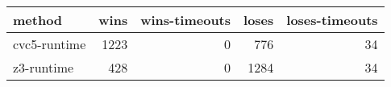 \begin{tabular}{lrrrr}
\hline
 method       &   wins &   wins-timeouts &   loses &   loses-timeouts \\
\hline
 cvc5-runtime &   1223 &               0 &     776 &               34 \\
 z3-runtime   &    428 &               0 &    1284 &               34 \\
\hline
\end{tabular}
